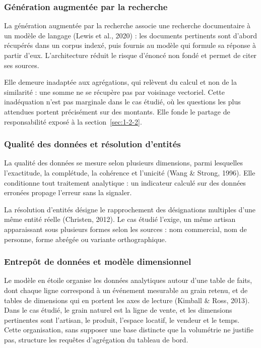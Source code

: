 \subsubsection{Génération augmentée par la recherche}

La génération augmentée par la recherche associe une recherche documentaire à un modèle de langage (Lewis et al., 2020) : les documents pertinents sont d'abord récupérés dans un corpus indexé, puis fournis au modèle qui formule sa réponse à partir d'eux. L'architecture réduit le risque d'énoncé non fondé et permet de citer ses sources.

Elle demeure inadaptée aux agrégations, qui relèvent du calcul et non de la similarité : une somme ne se récupère pas par voisinage vectoriel. Cette inadéquation n'est pas marginale dans le cas étudié, où les questions les plus attendues portent précisément sur des montants. Elle fonde le partage de responsabilité exposé à la section~\ref{sec:1-2-2}.

\subsubsection{Qualité des données et résolution d'entités}

La qualité des données se mesure selon plusieurs dimensions, parmi lesquelles l'exactitude, la complétude, la cohérence et l'unicité (Wang \& Strong, 1996). Elle conditionne tout traitement analytique : un indicateur calculé sur des données erronées propage l'erreur sans la signaler.

La résolution d'entités désigne le rapprochement des désignations multiples d'une même entité réelle (Christen, 2012). Le cas étudié l'exige, un même artisan apparaissant sous plusieurs formes selon les sources : nom commercial, nom de personne, forme abrégée ou variante orthographique.

\subsubsection{Entrepôt de données et modèle dimensionnel}

Le modèle en étoile organise les données analytiques autour d'une table de faits, dont chaque ligne correspond à un événement mesurable au grain retenu, et de tables de dimensions qui en portent les axes de lecture (Kimball \& Ross, 2013). Dans le cas étudié, le grain naturel est la ligne de vente, et les dimensions pertinentes sont l'artisan, le produit, l'espace locatif, le vendeur et le temps. Cette organisation, sans supposer une base distincte que la volumétrie ne justifie pas, structure les requêtes d'agrégation du tableau de bord.

